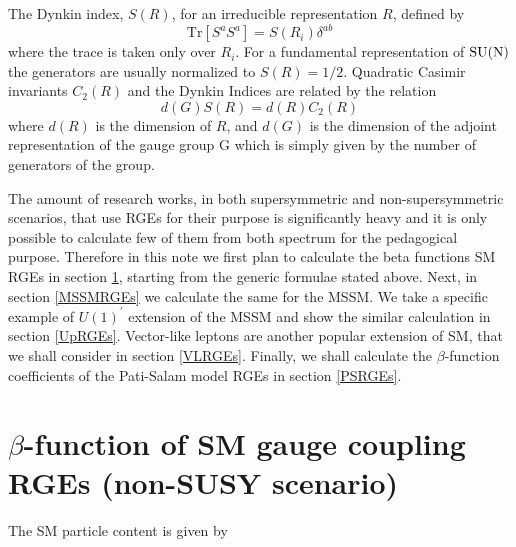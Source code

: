 \documentclass[11pt,prd,superscriptaddress,nofootinbib]{revtex4-1}
\numberwithin{equation}{section}
\newcommand{\uonep}{\ensuremath{U(1)^\prime}}
\newcommand{\be}{\begin{equation}}
\newcommand{\ee}{\end{equation}}
\begin{document}
The Dynkin index, $S(R)$, for an irreducible representation $R$, defined by
\be \label{eq:defDynkin}
\mathrm{Tr}[S^aS^a] = S(R_i)\delta^{ab}
\ee
where the trace is taken only over $R_i$. For a fundamental representation of $\rm SU(N)$ the generators are usually normalized to $S(R) = 1/2$. Quadratic Casimir invariants $C_2(R)$ and the Dynkin Indices are related by the relation
\be \label{CasDyn}
d(G)S(R) = d(R)C_2(R)
\ee
where $d(R)$ is the dimension of $R$, and $d(G)$ is the dimension of the adjoint representation of the gauge group G which is simply given by the number of generators of the group. 

The amount of research works, in both supersymmetric and non-supersymmetric scenarios, that use RGEs for their purpose is significantly heavy and it is only possible to calculate few of them from both spectrum for the pedagogical purpose. Therefore in this note we first plan to calculate the beta functions SM RGEs in section \ref{SMRGEs}, starting from the generic formulae stated above. Next, in section \ref{MSSMRGEs} we calculate the same for the MSSM. We take a specific example of $\uonep$ extension of the MSSM and show the similar calculation in section \ref{UpRGEs}. Vector-like leptons are another popular extension of SM, that we shall consider in section \ref{VLRGEs}. Finally, we shall calculate the $\beta$-function coefficients of the Pati-Salam model RGEs in section \ref{PSRGEs}.










\section{$\beta$-function of SM gauge coupling RGEs (non-SUSY scenario)}
\label{SMRGEs}

The SM particle content is given by
\end{document}
